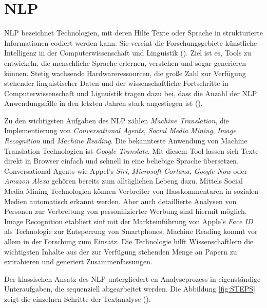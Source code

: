 \section{NLP}

\ac{NLP} bezeichnet Technologien, mit deren Hilfe Texte oder Sprache in strukturierte Informationen codiert werden kann. Sie vereint die Forschungsgebiete künstliche Intelligenz in der Computerwissenschaft und Linguistik (\cite[vgl.][1]{ITWISSEN}). Ziel ist es, Tools zu entwickeln, die menschliche Sprache erlernen, verstehen und sogar generieren können. Stetig wachsende Hardwareressourcen, die große Zahl zur Verfügung stehender linguistischer Daten und der wissenschaftliche Fortschritte in Computerwissenschaft und Lignuistik tragen dazu bei, dass die Anzahl der \ac{NLP} Anwendungsfälle in den letzten Jahren stark angestiegen ist (\cite[vgl.][1]{HIRSCHBERG}). 
\par
Zu den wichtigsten Aufgaben des \ac{NLP} zählen \textit{Machine Translation}, die Implementierung von \textit{Conversational Agents}, \textit{Social Media Mining}, \textit{Image Recognition} und \textit{Machine Reading}. Die bekannteste Anwendung  von Machine Translation Technologien ist \textit{Google Translate}. Mit diesem Tool lassen sich Texte direkt in Browser einfach und schnell in eine beliebige Sprache übersetzen. Conversational Agents wie Appel's\textit{ Siri}, \textit{Microsoft Cortana}, \textit{Google Now} oder \textit{Amazon Alexa} gehören bereits zum alltäglichen Lebeng dazu. Mittels Social Media Mining Technologien können Verbreiter von Hasskommentaren in sozialen Medien automatisch erkannt werden. Aber auch detaillierte Analysen von Personen zur Verbreitung von personifizierter Werbung sind hiermit möglich. Image Recognition etabliert sinf mit der Markteinführung von Apple's \textit{Face ID} als Technologie zur Entsperrung von Smartphones. Machine Reading kommt vor allem in der Forschung zum Einsatz. Die Technologie hilft Wissenschaftlern die wichtigsten Inhalte aus der zur Verfügung stehenden Menge an Papern zu extrahieren und generiert Zusammenfassungen.
\par
Der klassischen Ansatz des \ac{NLP} untergliedert en Analyseprozess in eigenständige Unteraufgaben, die sequenziell abgearbeitet werden. Die Abbildung \ref{fig:STEPS} zeigt die einzelnen Schritte der Textanalyse (\cite[vgl.][4]{DALE}). 
\par
